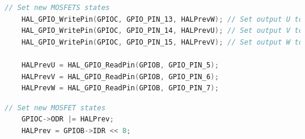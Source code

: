 \begin{lstlisting}[caption={Set MOSFET ON/OFF states using HAL functions},label={lst:HALFunction},language=C]
    // Set new MOSFETS states
	HAL_GPIO_WritePin(GPIOC, GPIO_PIN_13, HALPrevW); // Set output U to previous HAL state W
	HAL_GPIO_WritePin(GPIOC, GPIO_PIN_14, HALPrevU); // Set output V to previous HAL state U
	HAL_GPIO_WritePin(GPIOC, GPIO_PIN_15, HALPrevV); // Set output W to previous HAL state V
	
	HALPrevU = HAL_GPIO_ReadPin(GPIOB, GPIO_PIN_5);
	HALPrevV = HAL_GPIO_ReadPin(GPIOB, GPIO_PIN_6);
	HALPrevW = HAL_GPIO_ReadPin(GPIOB, GPIO_PIN_7);	
\end{lstlisting}

\begin{lstlisting}[caption={Set MOSFET ON/OFF states using registers},label={lst:Registers},language=C]
    // Set new MOSFET states
    GPIOC->ODR |= HALPrev;
	HALPrev = GPIOB->IDR << 8;
\end{lstlisting}

